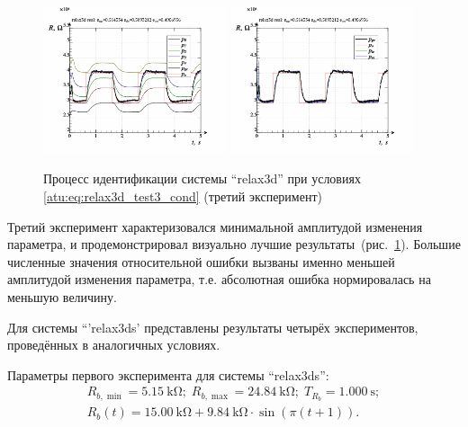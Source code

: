 \begin{figure}[htb!]
  \centerline{
    \includegraphics[width=0.48\textwidth]{p/relax3d_read_id2-p_p_02.png}
    \hfill
    \includegraphics[width=0.48\textwidth]{p/relax3d_read_id2-p_pp_02.png}
  }
  \caption{Процесс идентификации системы ``relax3d'' при условиях \ref{atu:eq:relax3d_test3_cond} (третий эксперимент)}
  \label{atu:f:relax3d_id_3}
\end{figure}

Третий эксперимент
характеризовался минимальной амплитудой изменения параметра,
и продемонстрировал визуально лучшие результаты~(рис.~\ref{atu:f:relax3d_id_3}).
Большие численные значения относительной ошибки
вызваны именно меньшей амплитудой изменения параметра,
т.е. абсолютная ошибка нормировалась на меньшую величину.




Для системы ``'relax3ds' представлены результаты четырёх экспериментов,
проведённых в аналогичных условиях.

Параметры первого эксперимента для системы ``relax3ds'':
%
\begin{equation}
  \begin{array}{c}
    R_{b,\min} = \SI{5.15}{\kilo\ohm};
    \;
    R_{b,\max} = \SI{24.84}{\kilo\ohm};
    \;
    T_{R_b} = \SI{1.000}{\second};
  \\
    R_b(t) = \SI{15.00}{\kilo\ohm} + \SI{9.84}{\kilo\ohm} \cdot \sin( \pi ( t + 1 ) ).
  \end{array}
  \label{atu:eq:relax3ds_test1_cond}
\end{equation}


